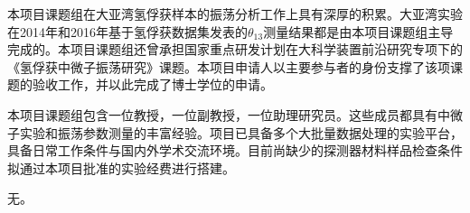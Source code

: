 \documentclass[a4paper,zihao=-4]{article}
\begin{document}

本项目课题组在大亚湾氢俘获样本的振荡分析工作上具有深厚的积累。大亚湾实验在2014年和2016年基于氢俘获数据集发表的$\theta_{13}$测量结果都是由本项目课题组主导完成的。本项目课题组还曾承担国家重点研发计划在大科学装置前沿研究专项下的《氢俘获中微子振荡研究》课题。本项目申请人以主要参与者的身份支撑了该项课题的验收工作，并以此完成了博士学位的申请。


本项目课题组包含一位教授，一位副教授，一位助理研究员。这些成员都具有中微子实验和振荡参数测量的丰富经验。项目已具备多个大批量数据处理的实验平台，具备日常工作条件与国内外学术交流环境。目前尚缺少的探测器材料样品检查条件拟通过本项目批准的实验经费进行搭建。


无。
\end{document}
